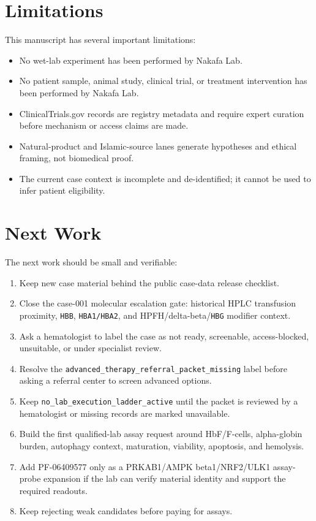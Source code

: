 \section{Limitations}

This manuscript has several important limitations:

\begin{itemize}[leftmargin=*]
  \item No wet-lab experiment has been performed by Nakafa Lab.
  \item No patient sample, animal study, clinical trial, or treatment
  intervention has been performed by Nakafa Lab.
  \item ClinicalTrials.gov records are registry metadata and require expert
  curation before mechanism or access claims are made.
  \item Natural-product and Islamic-source lanes generate hypotheses and
  ethical framing, not biomedical proof.
  \item The current case context is incomplete and de-identified; it cannot be
  used to infer patient eligibility.
\end{itemize}

\section{Next Work}

The next work should be small and verifiable:

\begin{enumerate}[leftmargin=*]
  \item Keep new case material behind the public case-data release checklist.
  \item Close the case-001 molecular escalation gate: historical HPLC
  transfusion proximity, \texttt{HBB}, \texttt{HBA1/HBA2}, and
  HPFH/delta-beta/\texttt{HBG} modifier context.
  \item Ask a hematologist to label the case as not ready, screenable,
  access-blocked, unsuitable, or under specialist review.
  \item Resolve the \texttt{advanced\_therapy\_referral\_packet\_missing}
  label before asking a referral center to screen advanced options.
  \item Keep \texttt{no\_lab\_execution\_ladder\_active} until the packet is
  reviewed by a hematologist or missing records are marked unavailable.
  \item Build the first qualified-lab assay request around HbF/F-cells,
  alpha-globin burden, autophagy context, maturation, viability, apoptosis, and
  hemolysis.
  \item Add PF-06409577 only as a PRKAB1/AMPK beta1/NRF2/ULK1 assay-probe
  expansion if the lab can verify material identity and support the required
  readouts.
  \item Keep rejecting weak candidates before paying for assays.
\end{enumerate}
